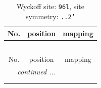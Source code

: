 \documentclass[fleqn,8pt]{jsarticle}
\begin{document}
\renewcommand{\arraystretch}{1.2}
\begin{longtable}{ccc}
\caption{Wyckoff site: {\tt 96l}, site symmetry: {\tt ..2'}}
 \\
 \hline \hline
No. & position & mapping \\ \hline \endfirsthead

\multicolumn{2}{l}{\tablename\ \thetable{}} \\
 \hline \hline
No. & position & mapping \\ \hline \endhead

 \hline \hline
\multicolumn{2}{r}{\footnotesize\it continued ...} \\ \endfoot

 \hline \hline
\multicolumn{2}{r}{} \\ \endlastfoot


\end{longtable}
\end{document}
